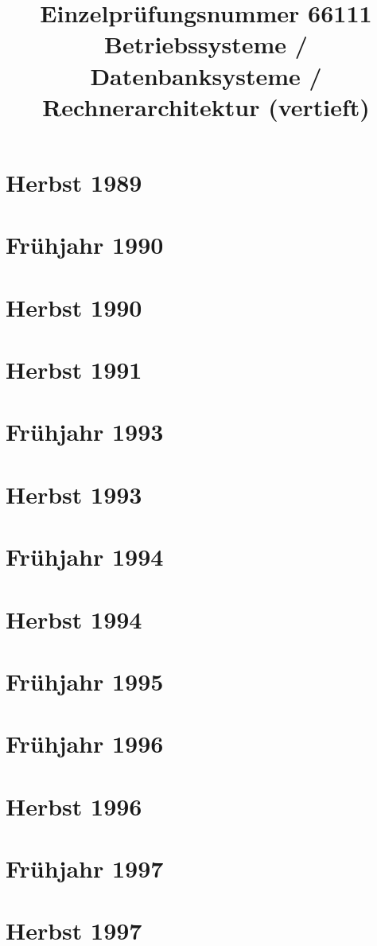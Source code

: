 \documentclass{lehramt-informatik-examen-sammlung}
\title{Einzelprüfungsnummer 66111\\Betriebssysteme / Datenbanksysteme / Rechnerarchitektur (vertieft)}
\begin{document}
\maketitle
\tableofcontents

\section{Herbst 1989}


\section{Frühjahr 1990}


\section{Herbst 1990}


\section{Herbst 1991}


\section{Frühjahr 1993}


\section{Herbst 1993}


\section{Frühjahr 1994}


\section{Herbst 1994}


\section{Frühjahr 1995}


\section{Frühjahr 1996}


\section{Herbst 1996}


\section{Frühjahr 1997}


\section{Herbst 1997}

\end{document}
